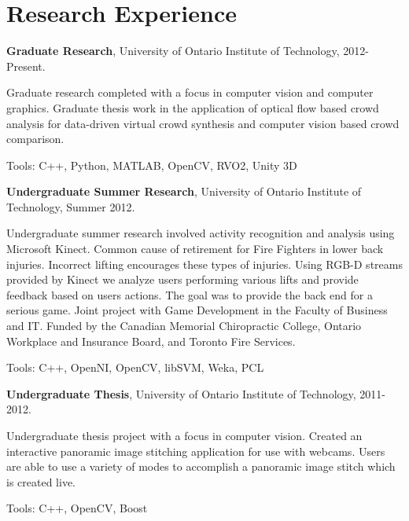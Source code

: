 \documentclass[letterpaper]{article}
\renewenvironment{itemize}{
  \begin{list}{}{
    \setlength{\leftmargin}{1.5em}
  }
}{
  \end{list}
}
\begin{document}
\section*{Research Experience}
\begin{itemize}
\item \textbf{Graduate Research}, University of Ontario Institute of Technology, 2012-Present.
  \begin{itemize}
	  \item Graduate research completed with a focus in computer vision and computer graphics.  Graduate thesis work in the application of
      optical flow based crowd analysis for data-driven virtual crowd synthesis and computer vision based crowd comparison.
    \item Tools: C++, Python, MATLAB, OpenCV, RVO2, Unity 3D
  \end{itemize}
\item \textbf{Undergraduate Summer Research}, University of Ontario Institute of Technology,  Summer 2012.
  \begin{itemize}
	\item Undergraduate summer research involved activity recognition and analysis using Microsoft Kinect.  Common cause of retirement for Fire Fighters in lower back injuries.  Incorrect lifting encourages these types of injuries.  Using RGB-D streams provided by Kinect we
  analyze users performing various lifts and provide feedback based on users actions.  The goal was to provide the back end for a serious game.  Joint project with Game Development in the Faculty of Business and IT. Funded by the Canadian Memorial Chiropractic College, Ontario Workplace and Insurance Board, and Toronto Fire Services.
  \item Tools: C++, OpenNI, OpenCV, libSVM, Weka, PCL
  \end{itemize}
\item \textbf{Undergraduate Thesis}, University of Ontario Institute of Technology, 2011-2012.
  \begin{itemize}
	  \item Undergraduate thesis project with a focus in computer vision.  Created an interactive panoramic image stitching application for use with webcams. Users are able to use a variety of modes to accomplish a panoramic image stitch which is created live.
    \item Tools: C++, OpenCV, Boost
  \end{itemize}
\end{itemize}
\end{document}
